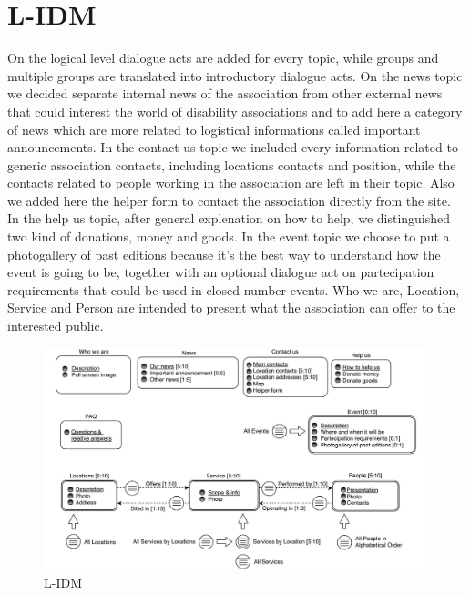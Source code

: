 \section{L-IDM}
On the logical level dialogue acts are added for every topic, while groups and multiple groups are translated into introductory dialogue acts. On the news topic we decided separate internal news of the association from other external news that could interest the world of disability associations and to add here a category of news which are more related to logistical informations called important announcements. In the contact us topic we included every information related to generic association contacts, including locations contacts and position, while the contacts related to people working in the association are left in their topic. Also we added here the helper form to contact the association directly from the site. In the help us topic, after general explenation on how to help, we distinguished two kind of donations, money and goods. In the event topic we choose to put a photogallery of past editions because it's the best way to understand how the event is going to be, together with an optional dialogue act on partecipation requirements that could be used in closed number events. Who we are, Location, Service and Person are intended to present what the association can offer to the interested public.
%
\begin{figure}[h]
\includegraphics[width=1.5\textwidth, center]{MainMatter/images/L-IDM.jpg}
\caption{L-IDM}
\label{fig:figure2}
\end{figure}
\newpage
%
